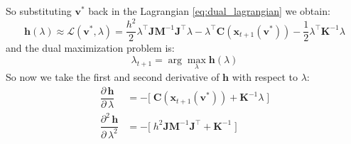 \documentclass{article}
\newcommand{\pd}[2]{\dfrac{\partial\, #1}{\partial\, #2}}
\newcommand{\pdv}[2]{\dfrac{\partial^2\, #1}{\partial\, #2^2}}
\begin{document}
So substituting $\mathbf{v}^*$ back in the Lagrangian \ref{eq:dual_lagrangian} we obtain:
\begin{equation}
    \mathbf{h}(\lambda) \approx
    \mathcal{L}(\mathbf{v}^*, \lambda) = 
    \frac{h^2}{2}\lambda^\top\mathbf{J}\mathbf{M}^{-1}\mathbf{J}^\top\lambda -
    \lambda^\top\mathbf{C}(\mathbf{x}_{t+1}(\mathbf{v}^*)) -
    \frac{1}{2}\lambda^\top\mathbf{K}^{-1}\lambda
\end{equation}
and the dual maximization problem is:
\begin{equation}
    \lambda_{t+1} = \arg \max_{\lambda} \mathbf{h}(\lambda) 
\end{equation}
So now we take the first and second derivative of $\mathbf{h}$ with respect to $\lambda$:
\begin{equation}
\begin{aligned}
    \pd{\mathbf{h}}{\lambda} &= - \bigg[\;
    \mathbf{C}(\mathbf{x}_{t+1}(\mathbf{v}^*)) +
    \mathbf{K}^{-1}\lambda\; \bigg] \\[1ex]
    \pdv{\mathbf{h}}{\lambda} &= - \bigg[\; h^2 \mathbf{J}\mathbf{M}^{-1}\mathbf{J}^\top +
    \mathbf{K}^{-1} \; \bigg]
\end{aligned}
\end{equation}
\end{document}

